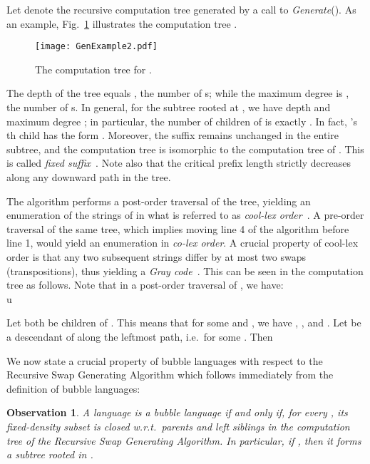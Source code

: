 \documentclass[11pt,a4paper]{llncs}
\newtheorem{observation}{Observation}
\begin{document}
Let  denote the recursive computation tree generated by a call to {\em Generate}().
As an example,  Fig.~\ref{fig:example1} illustrates the computation tree . 
\begin{figure}
\begin{center}
\texttt{[image: GenExample2.pdf]}
\caption{\label{fig:example1}The computation tree  for .}
\end{center}
\end{figure}

\noindent The depth of the tree equals , the number of s; while the maximum degree is , the number of s. In general, for the subtree rooted at , we have depth  and maximum degree ; in particular, the number of children of  is exactly . In fact, 's th child has the form . Moreover, the suffix  remains unchanged in the entire subtree, and the computation tree is isomorphic to the computation tree of . This  is called {\em fixed suffix}~\cite{RSW12}. Note also that the critical prefix length  strictly decreases along any downward path in the tree. 

The algorithm performs a post-order traversal of the tree, yielding an enumeration of the strings of  in what is referred to as {\em cool-lex order}~\cite{Wi09,SW12,RSW12}. A pre-order traversal of the same tree, which implies moving line 4 of the algorithm before line 1, would yield an enumeration in {\em co-lex order}. A crucial property of cool-lex order is that any two subsequent strings differ by at most two swaps (transpositions), thus yielding a {\em Gray code}~\cite{RSW12}. 
This can be seen in the computation tree  as follows. Note that in a post-order traversal of , we have:\\

u

\medskip


Let  both be children of . This means that for some  and , we have ,  , and . Let  be a  descendant of  along the leftmost path, i.e.\  for some . Then



\medskip 

We now state a crucial property of bubble languages with respect to the Recursive Swap Generating Algorithm which follows immediately from the definition of bubble languages: 


\begin{observation}\label{obs:tree}
A language  is a bubble language if and only if, for every , its fixed-density subset  is closed w.r.t.\ parents and left siblings in the computation tree  of the Recursive Swap Generating Algorithm. In particular, if , then it forms a subtree rooted in .
\end{observation}
\end{document}
